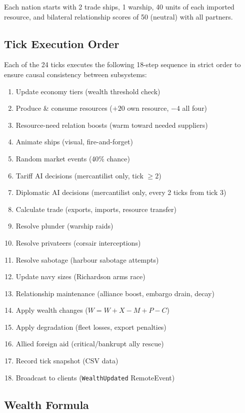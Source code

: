 \documentclass[12pt,a4paper]{article}
\begin{document}
Each nation starts with 2 trade ships, 1 warship, 40 units of each imported resource, and bilateral relationship scores of 50 (neutral) with all partners.

\subsection{Tick Execution Order}

Each of the 24 ticks executes the following 18-step sequence in strict order to ensure causal consistency between subsystems:

\begin{enumerate}
    \item Update economy tiers (wealth threshold check)
    \item Produce \& consume resources ($+20$ own resource, $-4$ all four)
    \item Resource-need relation boosts (warm toward needed suppliers)
    \item Animate ships (visual, fire-and-forget)
    \item Random market events (40\% chance)
    \item Tariff AI decisions (mercantilist only, tick $\geq 2$)
    \item Diplomatic AI decisions (mercantilist only, every 2 ticks from tick 3)
    \item Calculate trade (exports, imports, resource transfer)
    \item Resolve plunder (warship raids)
    \item Resolve privateers (corsair interceptions)
    \item Resolve sabotage (harbour sabotage attempts)
    \item Update navy sizes (Richardson arms race)
    \item Relationship maintenance (alliance boost, embargo drain, decay)
    \item Apply wealth changes ($W = W + X - M + P - C$)
    \item Apply degradation (fleet losses, export penalties)
    \item Allied foreign aid (critical/bankrupt ally rescue)
    \item Record tick snapshot (CSV data)
    \item Broadcast to clients (\texttt{WealthUpdated} RemoteEvent)
\end{enumerate}

\subsection{Wealth Formula}
\end{document}
